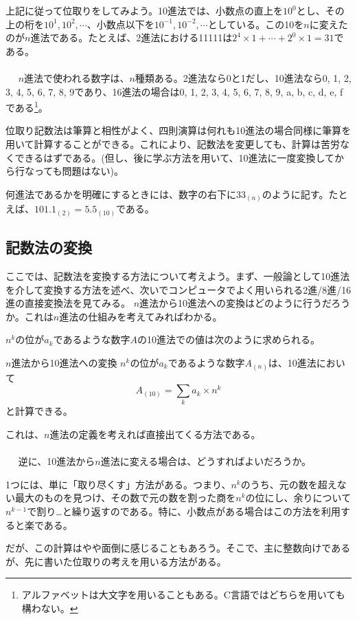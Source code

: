 上記に従って位取りをしてみよう。10進法では、小数点の直上を$10^0$とし、その上の桁を$10^1,10^2,\cdots$、小数点以下を$10^{-1},10^{-2},\cdots$としている。この10を$n$に変えたのが$n$進法である。たとえば、2進法における11111は$2^4\times1+\cdots+2^0\times1=31$である。
\\ \\　
$n$進法で使われる数字は、$n$種類ある。2進法なら0と1だし、10進法なら0, 1, 2, 3, 4, 5, 6, 7, 8, 9であり、16進法の場合は0, 1, 2, 3, 4, 5, 6, 7, 8, 9, a, b, c, d, e, fである\footnote{アルファベットは大文字を用いることもある。C言語ではどちらを用いても構わない。}。

位取り記数法は筆算と相性がよく、四則演算は何れも10進法の場合同様に筆算を用いて計算することができる。これにより、記数法を変更しても、計算は苦労なくできるはずである。(但し、後に学ぶ方法を用いて、10進法に一度変換してから行なっても問題はない)。

何進法であるかを明確にするときには、数字の右下に$33_{(n)}$のように記す。たとえば、$101.1_{(2)}=5.5_{(10)}$である。

\subsection{記数法の変換}
ここでは、記数法を変換する方法について考えよう。まず、一般論として10進法を介して変換する方法を述べ、次いでコンピュータでよく用いられる2進/8進/16進の直接変換法を見てみる。
$n$進法から10進法への変換はどのように行うだろうか。これは$n$進法の仕組みを考えてみればわかる。

$n^k$の位が$a_k$であるような数字$A$の10進法での値は次のように求められる。
\begin{itembox}[l]{$n$進法から10進法への変換}
$n^k$の位が$a_k$であるような数字$A_{(n)}$は、10進法において
\begin{equation*}
A_{(10)}=\sum_{k}a_k\times n^k
\end{equation*}
と計算できる。
\end{itembox}
これは、$n$進法の定義を考えれば直接出てくる方法である。
\\ \\　
逆に、10進法から$n$進法に変える場合は、どうすればよいだろうか。

1つには、単に「取り尽くす」方法がある。つまり、$n^k$のうち、元の数を超えない最大のものを見つけ、その数で元の数を割った商を$n^k$の位にし、余りについて$n^{k-1}$で割り…と繰り返すのである。特に、小数点がある場合はこの方法を利用すると楽である。

だが、この計算はやや面倒に感じることもあろう。そこで、主に整数向けであるが、先に書いた位取りの考えを用いる方法がある。

